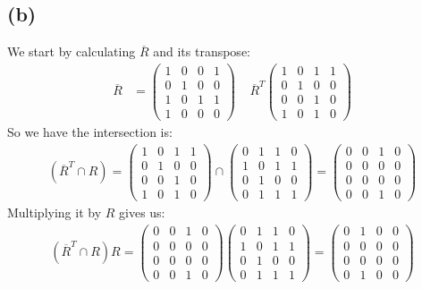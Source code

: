 \documentclass[a4paper, fleqn]{article}
\begin{document}
\subsection{(b)}
We start by calculating $\overline{R}$ and its transpose:
\begin{align*}
  \overline{R} &=
  \begin{pmatrix}
    1 & 0 & 0 & 1 \\
    0 & 1 & 0 & 0 \\
    1 & 0 & 1 & 1 \\
    1 & 0 & 0 & 0
  \end{pmatrix}
  \ \ \ \ \
  \overline{R}^T
  \begin{pmatrix}
    1 & 0 & 1 & 1 \\
    0 & 1 & 0 & 0 \\
    0 & 0 & 1 & 0 \\
    1 & 0 & 1 & 0
  \end{pmatrix}
\end{align*}
So we have the intersection is:
\begin{align*}
  \left( \overline{R}^T\cap R\right) =
  \begin{pmatrix}
    1 & 0 & 1 & 1 \\
    0 & 1 & 0 & 0 \\
    0 & 0 & 1 & 0 \\
    1 & 0 & 1 & 0
  \end{pmatrix} \cap
  \begin{pmatrix}
    0 & 1 & 1 & 0 \\
    1 & 0 & 1 & 1 \\
    0 & 1 & 0 & 0 \\
    0 & 1 & 1 & 1
  \end{pmatrix} =
 \begin{pmatrix}
    0 & 0 & 1 & 0 \\
    0 & 0 & 0 & 0 \\
    0 & 0 & 0 & 0 \\
    0 & 0 & 1 & 0
  \end{pmatrix}
\end{align*}
Multiplying it by $R$ gives us:
\begin{align*}
  \left( \overline{R}^T\cap R\right) R =
 \begin{pmatrix}
    0 & 0 & 1 & 0 \\
    0 & 0 & 0 & 0 \\
    0 & 0 & 0 & 0 \\
    0 & 0 & 1 & 0
  \end{pmatrix}
  \begin{pmatrix}
    0 & 1 & 1 & 0 \\
    1 & 0 & 1 & 1 \\
    0 & 1 & 0 & 0 \\
    0 & 1 & 1 & 1
  \end{pmatrix} =
  \begin{pmatrix}
    0 & 1 & 0 & 0 \\
    0 & 0 & 0 & 0 \\
    0 & 0 & 0 & 0 \\
    0 & 1 & 0 & 0
  \end{pmatrix}
\end{align*}
\end{document}

